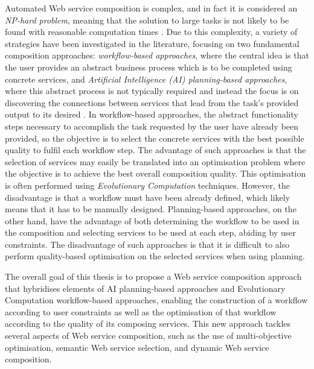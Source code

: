 Automated Web service composition is complex, and in fact it is considered an \textit{NP-hard problem}, meaning that the solution to large tasks is not likely to be found with reasonable computation times \cite{moghaddam2014service}. Due to this complexity, a variety of strategies have been investigated in the literature, focusing on two fundamental composition approaches: \textit{workflow-based approaches}, where the central idea is that the user provides an abstract business process which is to be completed using concrete services, and \textit{Artificial Intelligence (AI) planning-based approaches}, where this abstract process is not typically required and instead the focus is on discovering the connections between services that lead from the task's provided output to its desired \cite{moghaddam2014service}. In workflow-based approaches, the abstract functionality steps necessary to accomplish the task requested by the user have already been provided, so the objective is to select the concrete services with the best possible quality to fulfil each workflow step. The advantage of such approaches is that the selection of services may easily be translated into an optimisation problem where the objective is to achieve the best overall composition quality. This optimisation is often performed using \textit{Evolutionary Computation} techniques. However, the disadvantage is that a workflow must have been already defined, which likely means that it has to be manually designed. Planning-based approaches, on the other hand, have the advantage of both determining the workflow to be used in the composition and selecting services to be used at each step, abiding by user constraints. The disadvantage of such approaches is that it is difficult to also perform quality-based optimisation on the selected services when using planning.

The overall goal of this thesis is to propose a Web service composition approach that hybridises elements of AI planning-based approaches and Evolutionary Computation workflow-based approaches, enabling the construction of a workflow according to user constraints as well as the optimisation of that workflow according to the quality of its composing services. This new approach tackles several aspects of Web service composition, such as the use of multi-objective optimisation, semantic Web service selection, and dynamic Web service composition.

